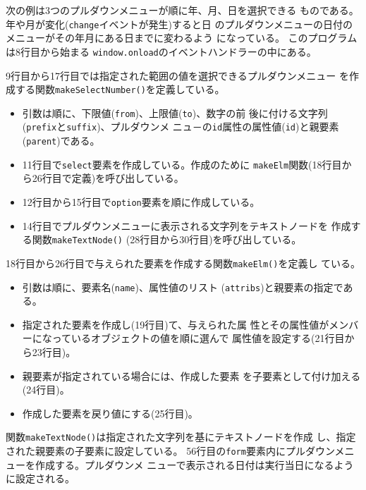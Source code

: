 \begin{Exec}\upshape\label{pulldownDate}
次の例は3つのプルダウンメニューが順に年、月、日を選択できる
 ものである。年や月が変化(\texttt{change}イベントが発生)すると日
 のプルダウンメニューの日付のメニューがその年月にある日までに変わるよう
 になっている。
 このプログラムは8行目から始まる
       \texttt{window.onload}のイベントハンドラーの中にある。

 9行目から17行目では指定された範囲の値を選択できるプルダウンメニュー
       を作成する関数\texttt{makeSelectNumber()}を定義している。
\begin{itemize}
 \item 引数は順に、下限値(\texttt{from})、上限値(\texttt{to})、数字の前
       後に付ける文字列(\texttt{prefix}と\texttt{suffix})、プルダウンメ
       ニュ－の\texttt{id}属性の属性値(\texttt{id})と親要素
       (\texttt{parent})である。
 \item 11行目で\texttt{select}要素を作成している。作成のために
       \texttt{makeElm}関数(18行目から26行目で定義)を呼び出している。
 \item 12行目から15行目で\texttt{option}要素を順に作成している。
 \item 14行目でプルダウンメニューに表示される文字列をテキストノードを
       作成する関数\texttt{makeTextNode()} (28行目から30行目)を呼び出している。
\end{itemize}
18行目から26行目で与えられた要素を作成する関数\texttt{makeElm()}を定義し
 ている。
\begin{itemize}
 \item 引数は順に、要素名(\texttt{name})、属性値のリスト
       (\texttt{attribs})と親要素の指定である。
 \item 指定された要素を作成し(19行目)て、与えられた属
			 性とその属性値がメンバーになっているオブジェクトの値を順に選んで
			 属性値を設定する(21行目から23行目)。
 \item 親要素が指定されている場合には、作成した要素
       を子要素として付け加える(24行目)。
 \item 作成した要素を戻り値にする(25行目)。
\end{itemize}
関数\texttt{makeTextNode()}は指定された文字列を基にテキストノードを作成
 し、指定された親要素の子要素に設定している。
56行目の\texttt{form}要素内にプルダウンメニューを作成する。プルダウンメ
 ニューで表示される日付は実行当日になるように設定される。

\end{Exec}
